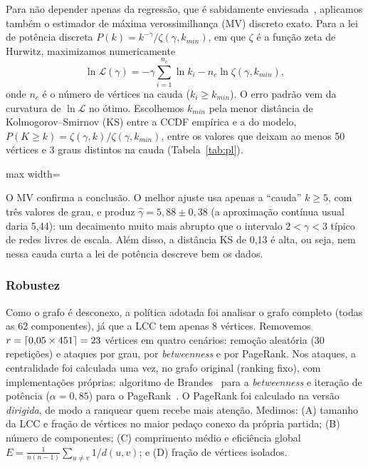 \documentclass[sigconf]{webmedia}
\begin{document}
Para não depender apenas da regressão, que é sabidamente enviesada~\cite{clauset2009}, aplicamos também o estimador de máxima verossimilhança (MV) discreto exato. Para a lei de potência discreta $P(k) = k^{-\gamma}/\zeta(\gamma, k_{min})$, em que $\zeta$ é a função zeta de Hurwitz, maximizamos numericamente
\[
  \ln \mathcal{L}(\gamma) = -\gamma \sum_{i=1}^{n_c} \ln k_i - n_c \ln \zeta(\gamma, k_{min}),
\]
onde $n_c$ é o número de vértices na cauda ($k_i \geq k_{min}$). O erro padrão vem da curvatura de $\ln \mathcal{L}$ no ótimo. Escolhemos $k_{min}$ pela menor distância de Kolmogorov--Smirnov (KS) entre a CCDF empírica e a do modelo, $P(K \geq k) = \zeta(\gamma, k)/\zeta(\gamma, k_{min})$, entre os valores que deixam ao menos 50 vértices e 3 graus distintos na cauda (Tabela~\ref{tab:pl}).

\begin{table}[h]
  \caption{Ajuste de lei de potência: regressão log-log e máxima verossimilhança.}
  \label{tab:pl}
  \begin{adjustbox}{max width=\columnwidth}
  
  \end{adjustbox}
\end{table}

O MV confirma a conclusão. O melhor ajuste usa apenas a ``cauda'' $k \geq 5$, com três valores de grau, e produz $\hat\gamma = 5{,}88 \pm 0{,}38$ (a aproximação contínua usual daria 5,44): um decaimento muito mais abrupto que o intervalo $2 < \gamma < 3$ típico de redes livres de escala. Além disso, a distância KS de 0,13 é alta, ou seja, nem nessa cauda curta a lei de potência descreve bem os dados.

\subsubsection{Robustez}
Como o grafo é desconexo, a política adotada foi analisar o grafo completo (todas as 62 componentes), já que a LCC tem apenas 8 vértices. Removemos $r = \lceil 0{,}05 \times 451 \rceil = 23$ vértices em quatro cenários: remoção aleatória (30 repetições) e ataques por grau, por \textit{betweenness} e por PageRank. Nos ataques, a centralidade foi calculada uma vez, no grafo original (ranking fixo), com implementações próprias: algoritmo de Brandes~\cite{brandes2001} para a \textit{betweenness} e iteração de potência ($\alpha = 0{,}85$) para o PageRank~\cite{page1999}. O PageRank foi calculado na versão \emph{dirigida}, de modo a ranquear quem recebe mais atenção. Medimos: (A) tamanho da LCC e fração de vértices no maior pedaço conexo da própria partida; (B) número de componentes; (C) comprimento médio e eficiência global $E = \frac{1}{n(n-1)}\sum_{u\neq v} 1/d(u,v)$; e (D) fração de vértices isolados.
\end{document}
